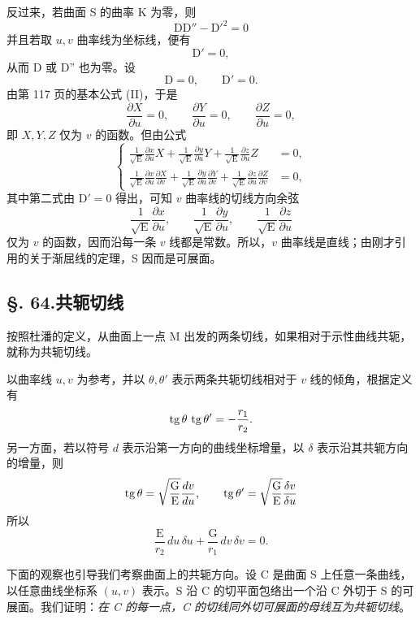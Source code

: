 反过来，若曲面 S 的曲率 K 为零，则
\[
\mathrm{D}\mathrm{D''}-\mathrm{D'}^2=0
\]
并且若取 \(u,v\) 曲率线为坐标线，便有
\[
\mathrm{D'}=0,
\]
从而 D 或 D'' 也为零。设
\[
\mathrm{D}=0, \qquad \mathrm{D'}=0.
\]
由第 117 页的基本公式 (II)，于是
\[
\frac{\partial X}{\partial u}=0, \qquad \frac{\partial Y}{\partial u}=0, \qquad \frac{\partial Z}{\partial u}=0,
\]
即 \(X,Y,Z\) 仅为 \(v\) 的函数。但由公式
\[
\left\{
\begin{aligned}
\frac{1}{\sqrt{\mathrm{E}}}\frac{\partial x}{\partial u}X+\frac{1}{\sqrt{\mathrm{E}}}\frac{\partial y}{\partial u}Y+\frac{1}{\sqrt{\mathrm{E}}}\frac{\partial z}{\partial u}Z&=0,\\
\frac{1}{\sqrt{\mathrm{E}}}\frac{\partial x}{\partial u}\frac{\partial X}{\partial v}+\frac{1}{\sqrt{\mathrm{E}}}\frac{\partial y}{\partial u}\frac{\partial Y}{\partial v}+\frac{1}{\sqrt{\mathrm{E}}}\frac{\partial z}{\partial u}\frac{\partial Z}{\partial v}&=0,
\end{aligned}
\right.
\]
其中第二式由 \(\mathrm{D'}=0\) 得出，可知 \(v\) 曲率线的切线方向余弦
\[
\frac{1}{\sqrt{\mathrm{E}}}\frac{\partial x}{\partial u},\qquad
\frac{1}{\sqrt{\mathrm{E}}}\frac{\partial y}{\partial u},\qquad
\frac{1}{\sqrt{\mathrm{E}}}\frac{\partial z}{\partial u}
\]
仅为 \(v\) 的函数，因而沿每一条 \(v\) 线都是常数。所以，\(v\) 曲率线是直线；由刚才引用的关于渐屈线的定理，S 因而是可展面。

\subsection*{§. 64.\quad 共轭切线}

按照杜潘的定义，从曲面上一点 M 出发的两条切线，如果相对于示性曲线共轭，就称为共轭切线。

以曲率线 \(u,v\) 为参考，并以 \(\theta,\theta'\) 表示两条共轭切线相对于 \(v\) 线的倾角，根据定义有
\[
\operatorname{tg}\theta\,\operatorname{tg}\theta'=-\frac{r_1}{r_2}.
\]
另一方面，若以符号 \(d\) 表示沿第一方向的曲线坐标增量，以 \(\delta\) 表示沿其共轭方向的增量，则
\[
\operatorname{tg}\theta=\sqrt{\frac{\mathrm{G}}{\mathrm{E}}}\frac{dv}{du}, \qquad
\operatorname{tg}\theta'=\sqrt{\frac{\mathrm{G}}{\mathrm{E}}}\frac{\delta v}{\delta u}
\]
所以
\begin{equation}\tag{19}
\frac{\mathrm{E}}{r_2}\,du\,\delta u+\frac{\mathrm{G}}{r_1}\,dv\,\delta v=0.
\end{equation}

下面的观察也引导我们考察曲面上的共轭方向。设 C 是曲面 S 上任意一条曲线，以任意曲线坐标系 \((u,v)\) 表示。S 沿 C 的切平面包络出一个沿 C 外切于 S 的可展面。我们证明：\emph{在 C 的每一点，C 的切线同外切可展面的母线互为共轭切线}。

